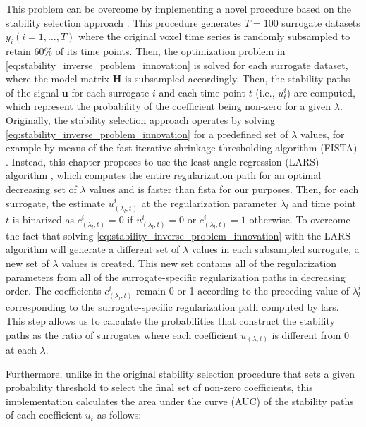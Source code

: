 This problem can be overcome by implementing a novel procedure based on the stability selection approach \citep{Meinshausen2010Stabilityselection}. This procedure generates $T = 100$ surrogate datasets $y_i  (i=1,\dots,T)$ where the original voxel time series is randomly subsampled to retain 60\% of its time points. Then, the optimization problem in \cref{eq:stability_inverse_problem_innovation} is solved for each surrogate dataset, where the model matrix $\mathbf{H}$ is
subsampled accordingly. Then, the stability paths of the signal $\mathbf{u}$ for
each surrogate $i$ and each time point $t$ (i.e., $u_t^i$) are computed, which
represent the probability of the coefficient being non-zero for a given
$\lambda$. Originally, the stability selection approach operates by solving
\cref{eq:stability_inverse_problem_innovation} for a predefined set of $\lambda$
values, for example by means of the fast iterative shrinkage thresholding
algorithm (FISTA) \citep{Beck2009FastIterativeShrinkage}. Instead, this
chapter proposes to use the least angle regression (LARS) algorithm
\citep{Efron2004Leastangleregression}, which computes the entire regularization
path for an optimal decreasing set of $\lambda$ values and is faster than
\acrshort*{fista} \citep{Beck2009FastIterativeShrinkage} for our purposes. Then,
for each surrogate, the estimate $u_(\lambda_l,t)^i$ at the regularization
parameter $\lambda_l$ and time point $t$ is binarized as $c_(\lambda_l,t)^i=0$
if $u_(\lambda_l,t)^i=0$ or $c_(\lambda_l,t)^i=1$ otherwise. To overcome the
fact that solving \cref{eq:stability_inverse_problem_innovation} with the LARS
algorithm will generate a different set of $\lambda$ values in each subsampled
surrogate, a new set of $\lambda$ values is created. This new set contains all
of the regularization parameters from all of the surrogate-specific
regularization paths in decreasing order. The
coefficients $c_(\lambda_l,t)^i$ remain 0 or 1 according to the preceding value
of $\lambda_l^i$ corresponding to the surrogate-specific regularization path
computed by \acrshort*{lars}. This step allows us to calculate the probabilities
that construct the stability paths as the ratio of surrogates where each
coefficient $u_(\lambda,t)$ is different from 0 at each $\lambda$. 

Furthermore, unlike in the original stability selection procedure that sets a given
probability threshold to select the final set of non-zero coefficients, this implementation
calculates the area under the curve (AUC) of the stability paths of each coefficient $u_t$ as follows:

